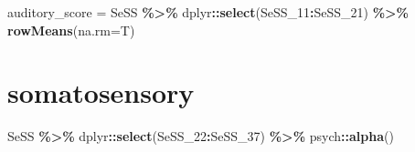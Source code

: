 \documentclass[
]{article}
\newenvironment{Shaded}{\begin{snugshade}}{\end{snugshade}}
\newcommand{\AttributeTok}[1]{\textcolor[rgb]{0.13,0.29,0.53}{#1}}
\newcommand{\FunctionTok}[1]{\textcolor[rgb]{0.13,0.29,0.53}{\textbf{#1}}}
\newcommand{\NormalTok}[1]{#1}
\newcommand{\OtherTok}[1]{\textcolor[rgb]{0.56,0.35,0.01}{#1}}
\newcommand{\SpecialCharTok}[1]{\textcolor[rgb]{0.81,0.36,0.00}{\textbf{#1}}}
\begin{document}
\begin{Shaded}
\begin{Highlighting}[]
\NormalTok{auditory\_score }\OtherTok{=}\NormalTok{ SeSS }\SpecialCharTok{\%\textgreater{}\%}\NormalTok{ dplyr}\SpecialCharTok{::}\FunctionTok{select}\NormalTok{(SeSS\_11}\SpecialCharTok{:}\NormalTok{SeSS\_21) }\SpecialCharTok{\%\textgreater{}\%} \FunctionTok{rowMeans}\NormalTok{(}\AttributeTok{na.rm=}\NormalTok{T)}
\end{Highlighting}
\end{Shaded}

\section{somatosensory}\label{somatosensory}

\begin{Shaded}
\begin{Highlighting}[]
\NormalTok{SeSS }\SpecialCharTok{\%\textgreater{}\%}\NormalTok{ dplyr}\SpecialCharTok{::}\FunctionTok{select}\NormalTok{(SeSS\_22}\SpecialCharTok{:}\NormalTok{SeSS\_37) }\SpecialCharTok{\%\textgreater{}\%}\NormalTok{ psych}\SpecialCharTok{::}\FunctionTok{alpha}\NormalTok{()}
\end{Highlighting}
\end{Shaded}
\end{document}
